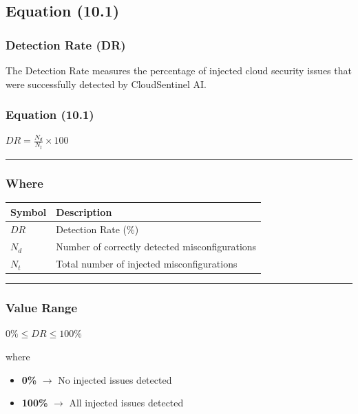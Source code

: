 \subsection{Equation (10.1)}

\subsubsection{Detection Rate (DR)}

The Detection Rate measures the percentage of injected cloud security issues that were successfully detected by CloudSentinel AI.

\subsubsection{\texorpdfstring{\textbf{Equation (10.1)}}{Equation (10.1)}}

$DR = \frac{N_d}{N_t} \times 100$

\begin{center}\rule{0.5\linewidth}{0.5pt}\end{center}

\subsubsection{Where}

\begin{longtable}[]{@{}ll@{}}
\toprule\noalign{}
Symbol & Description \\
\midrule\noalign{}
\endhead
\bottomrule\noalign{}
\endlastfoot
$DR$ & Detection Rate (\%) \\
$N_d$ & Number of correctly detected misconfigurations \\
$N_t$ & Total number of injected misconfigurations \\
\end{longtable}

\begin{center}\rule{0.5\linewidth}{0.5pt}\end{center}

\subsubsection{Value Range}

$0\% \leq DR \leq 100\%$

where

\begin{itemize}
\tightlist
\item
  \textbf{0\%} \(\rightarrow\) No injected issues detected\\
\item
  \textbf{100\%} \(\rightarrow\) All injected issues detected
\end{itemize}

